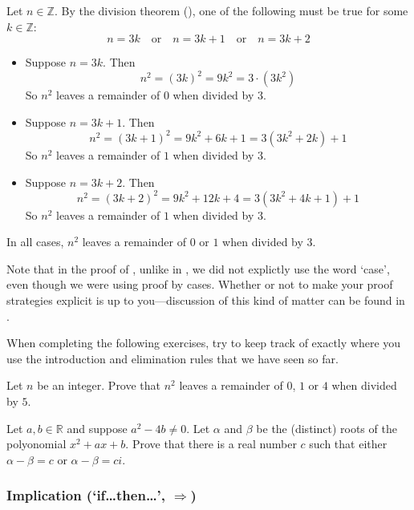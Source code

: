 \begin{cproof}
Let $n \in \mathbb{Z}$. By the division theorem (), one of the following must be true for some $k \in \mathbb{Z}$:
\[
n=3k \quad \text{or} \quad n=3k+1 \quad \text{or} \quad n=3k+2
\]
\begin{itemize}
\item Suppose $n=3k$. Then
\[
n^2 = (3k)^2 = 9k^2 = 3 \cdot (3k^2)
\]
So $n^2$ leaves a remainder of $0$ when divided by $3$.
\item Suppose $n=3k+1$. Then
\[
n^2 = (3k+1)^2 = 9k^2+6k+1 = 3(3k^2+2k)+1
\]
So $n^2$ leaves a remainder of $1$ when divided by $3$.
\item Suppose $n=3k+2$. Then
\[
n^2 = (3k+2)^2 = 9k^2+12k+4 = 3(3k^2+4k+1)+1
\]
So $n^2$ leaves a remainder of $1$ when divided by $3$.
\end{itemize}
In all cases, $n^2$ leaves a remainder of $0$ or $1$ when divided by $3$.
\end{cproof}

Note that in the proof of , unlike in , we did not explictly use the word `case', even though we were using proof by cases. Whether or not to make your proof strategies explicit is up to you---discussion of this kind of matter can be found in .

When completing the following exercises, try to keep track of exactly where you use the introduction and elimination rules that we have seen so far.

\begin{exercise}
Let $n$ be an integer. Prove that $n^2$ leaves a remainder of $0$, $1$ or $4$ when divided by $5$.
\end{exercise}

\begin{exercise}
Let $a,b \in \mathbb{R}$ and suppose $a^2-4b \ne 0$. Let $\alpha$ and $\beta$ be the (distinct) roots of the polyonomial $x^2+ax+b$. Prove that there is a real number $c$ such that either $\alpha-\beta = c$ or $\alpha - \beta = ci$.
\end{exercise}

\subsubsection*{Implication (`if\dots{}then\dots{}', $\Rightarrow$)}

